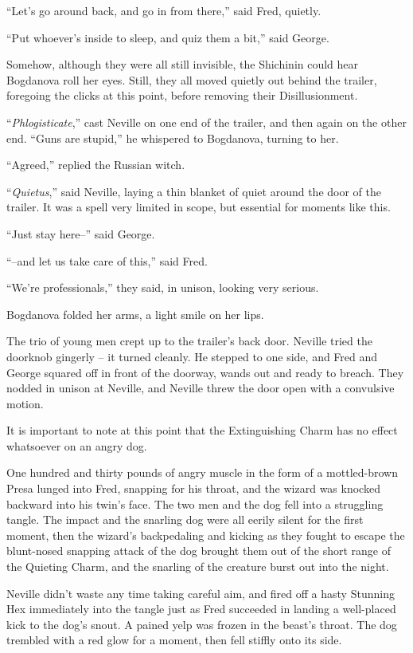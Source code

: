 ``Let's go around back, and go in from there,'' said Fred, quietly.

``Put whoever's inside to sleep, and quiz them a bit,'' said George.

Somehow, although they were all still invisible, the Shichinin could
hear Bogdanova roll her eyes. Still, they all moved quietly out behind
the trailer, foregoing the clicks at this point, before removing their
Disillusionment.

``\emph{Phlogisticate},'' cast Neville on one end of the trailer, and
then again on the other end. ``Guns are stupid,'' he whispered to
Bogdanova, turning to her.

``Agreed,'' replied the Russian witch.

``\emph{Quietus},'' said Neville, laying a thin blanket of quiet around
the door of the trailer. It was a spell very limited in scope, but
essential for moments like this.

``Just stay here--'' said George.

``--and let us take care of this,'' said Fred.

``We're professionals,'' they said, in unison, looking very serious.

Bogdanova folded her arms, a light smile on her lips.

The trio of young men crept up to the trailer's back door. Neville tried
the doorknob gingerly -- it turned cleanly. He stepped to one side, and
Fred and George squared off in front of the doorway, wands out and ready
to breach. They nodded in unison at Neville, and Neville threw the door
open with a convulsive motion.

It is important to note at this point that the Extinguishing Charm has
no effect whatsoever on an angry dog.

One hundred and thirty pounds of angry muscle in the form of a
mottled-brown Presa lunged into Fred, snapping for his throat, and the
wizard was knocked backward into his twin's face. The two men and the
dog fell into a struggling tangle. The impact and the snarling dog were
all eerily silent for the first moment, then the wizard's backpedaling
and kicking as they fought to escape the blunt-nosed snapping attack of
the dog brought them out of the short range of the Quieting Charm, and
the snarling of the creature burst out into the night.

Neville didn't waste any time taking careful aim, and fired off a hasty
Stunning Hex immediately into the tangle just as Fred succeeded in
landing a well-placed kick to the dog's snout. A pained yelp was frozen
in the beast's throat. The dog trembled with a red glow for a moment,
then fell stiffly onto its side.

